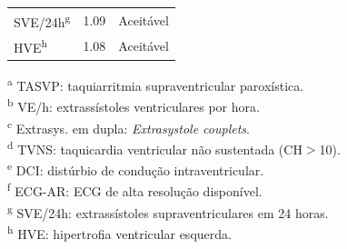 \begin{table}[htbp]
{\begin{tabular}{lcc}
			SVE/24h\textsuperscript{g}            & 1.09  & Aceit\'avel                                      \\
			HVE\textsuperscript{h}                & 1.08  & Aceit\'avel                                      \\
			\bottomrule
		\end{tabular}%
	}
	\begin{flushleft}
		\footnotesize
		\textsuperscript{a} TASVP: taquiarritmia supraventricular paroxística.\\
		\textsuperscript{b} VE/h: extrassístoles ventriculares por hora.\\
		\textsuperscript{c} Extrasys. em dupla: \textit{Extrasystole couplets}.\\
		\textsuperscript{d} TVNS: taquicardia ventricular não sustentada (CH$>$10).\\
		\textsuperscript{e} DCI: distúrbio de condução intraventricular.\\
		\textsuperscript{f} ECG-AR: ECG de alta resolução disponível.\\
		\textsuperscript{g} SVE/24h: extrassístoles supraventriculares em 24 horas.\\
		\textsuperscript{h} HVE: hipertrofia ventricular esquerda.
	\end{flushleft}
\end{table}

\FloatBarrier


